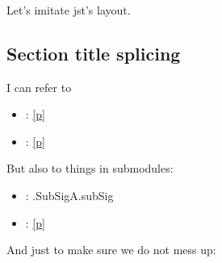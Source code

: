 {\begin{ocamlindent}
\label{container-page-test-module-Ocamlary-module-Aliases-module-X2}\\
\label{container-page-test-module-Ocamlary-module-Aliases-type-p1}\\
\label{container-page-test-module-Ocamlary-module-Aliases-type-p2}\\
\end{ocamlindent}%
\begin{ocamlindent}Let's imitate jst's layout.\end{ocamlindent}%
\medbreak
\subsection{Section title splicing\label{section-title-splicing}}%
I can refer to

\begin{itemize}\item{ : \hyperref[container-page-test-module-Ocamlary-indexmodules]{[p\pageref*{container-page-test-module-Ocamlary-indexmodules}]}}%
\item{ : \hyperref[container-page-test-module-Ocamlary-aliases]{[p\pageref*{container-page-test-module-Ocamlary-aliases}]}}\end{itemize}%
But also to things in submodules:

\begin{itemize}\item{ : .SubSigA.subSig}%
\item{ : \hyperref[container-page-test-module-Ocamlary-incl]{[p\pageref*{container-page-test-module-Ocamlary-incl}]}}\end{itemize}%
And just to make sure we do not mess up:

}
